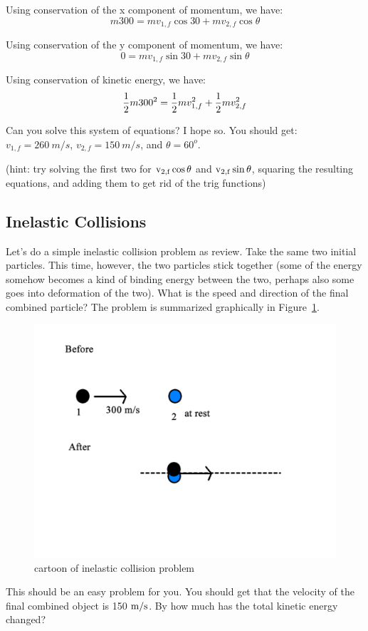 Using conservation of the x component of momentum, we have:
$$ m 300 = m v_{1,f} \cos{30} + m v_{2,f} \cos{\theta} $$

Using conservation of the y component of momentum, we have:
$$ 0 = m v_{1,f} \sin{30} + m v_{2,f} \sin{\theta} $$

Using conservation of kinetic energy, we have:
$$ {1 \over 2} m 300^2 = {1 \over 2} m v_{1,f}^2 + {1 \over 2} m v_{2,f}^2 $$

Can you solve this system of equations?  I hope so.  You should get:
$v_{1,f}=260~m/s$, $v_{2,f}=150~m/s$, and $\theta = 60^o$.

(hint: try solving the first two for 
${\rm v_{2,f} \cos{\theta}}$ and ${\rm v_{2,f} \sin{\theta}}$, 
squaring the resulting equations, and adding them to get rid of the trig functions)

\subsection{Inelastic Collisions}

Let's do a simple inelastic collision problem as review.  Take the same two initial particles.  This time, however, the two particles stick together (some of the energy somehow becomes a kind of binding energy between the two, perhaps also some goes into deformation of the two).  What is the speed and direction of the final combined particle?  The problem is summarized graphically in Figure~\ref{fig:inelastic}.
 
\begin{figure}[h]
\centering\includegraphics[scale=0.5]{./collisions/Pictures/inelastic.pdf}
\caption{cartoon of inelastic collision problem}
\label{fig:inelastic}
\end{figure}


This should be an easy problem for you.  You should get that the velocity of the final combined object is 150 ${\rm m/s}$.
By how much has the total kinetic energy changed?
